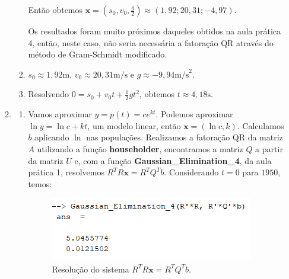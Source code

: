 \documentclass[11pt]{article}
\begin{document}
\begin{enumerate}
\begin{enumerate}[label=\arabic*)]
\begin{enumerate}[label=\alph*)]
                    Então obtemos $\mathbf{x} = (s_0, v_0, \frac{g}{2}) \approx (1,92; 20,31; -4,97)$.
                    
                    Os resultados foram muito próximos daqueles obtidos na aula prática 4, então, neste caso, não seria necessária a fatoração QR através do método de Gram-Schmidt modificado.
                    
                    \bigbreak
                    
                    \item $s_0 \approx 1,92 \textrm{m}$, $v_0 \approx 20,31\textrm{m/s}$ e $g \approx -9,94 \textrm{m/s}^2$.
                    
                    \bigbreak
                    
                    \item Resolvendo $0 = s_0 + v_0t + \frac{1}{2}gt^2$, obtemos $t\approx 4,18 \textrm{s}$.
                    
                \bigbreak
                \end{enumerate}
                
                \item
                
                \begin{enumerate}[label=\alph*)]
                    \item Vamos aproximar $y = p(t) = ce^{kt}$. Podemos aproximar $\ln y = \ln c + kt$, um modelo linear, então $\mathbf{x} = (\ln c, k)$. Calculamos $b$ aplicando $\ln$ nas populações. Realizamos a fatoração QR da matriz $A$ utilizando a função \textbf{householder}, encontramos a matriz $Q$ a partir da matriz $U$ e, com a função \textbf{Gaussian\_Elimination\_4}, da aula prática 1, resolvemos $R^TR\mathbf{x} = R^TQ^Tb$. Considerando $t=0$ para $1950$, temos:
                
                    \begin{figure}[H]
                        \centering
                        \includegraphics[]{4-2}
                        \caption{Resolução do sistema $R^TR\mathbf{x} = R^TQ^Tb$.}
                    \end{figure}
                    

\end{enumerate}
\end{enumerate}
\end{enumerate}
\end{document}
